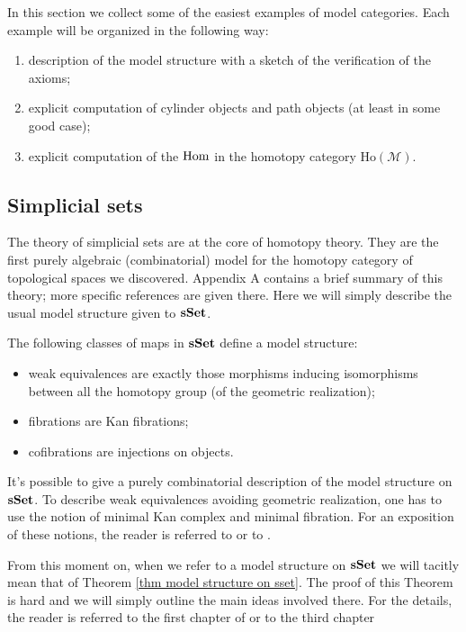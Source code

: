 \begin{refsection}
In this section we collect some of the easiest examples of model categories. Each example will be organized in the following way:

\begin{enumerate}
\item description of the model structure with a sketch of the verification of the axioms;
\item explicit computation of cylinder objects and path objects (at least in some good case);
\item explicit computation of the $\mathrm{Hom}$ in the homotopy category $\mathrm{Ho}(\mathcal M)$.
\end{enumerate}

\subsection{Simplicial sets}

The theory of simplicial sets are at the core of homotopy theory. They are the first purely algebraic (combinatorial) model for the homotopy category of topological spaces we discovered. Appendix A contains a brief summary of this theory; more specific references are given there. Here we will simply describe the usual model structure given to $\mathbf{s\,\!\mathbf{Set}}$.

\begin{thm} \label{thm model structure on sset}
The following classes of maps in $\mathbf{s\,\!\mathbf{Set}}$ define a model structure:
\begin{itemize}
\item weak equivalences are exactly those morphisms inducing isomorphisms between all the homotopy group (of the geometric realization);
\item fibrations are Kan fibrations;
\item cofibrations are injections on objects.
\end{itemize}
\end{thm}

\begin{rmk}
It's possible to give a purely combinatorial description of the model structure on $\mathbf{s\,\!\mathbf{Set}}$. To describe weak equivalences avoiding geometric realization, one has to use the notion of minimal Kan complex and minimal fibration. For an exposition of these notions, the reader is referred to \cite{may} or to \cite[section I.10]{goerss-jardine-simplicial-homotopy-theory}.
\end{rmk}

From this moment on, when we refer to a model structure on $\mathbf{s\,\!\mathbf{Set}}$ we will tacitly mean that of Theorem \ref{thm model structure on sset}. The proof of this Theorem is hard and we will simply outline the main ideas involved there. For the details, the reader is referred to the first chapter of \cite{goerss-jardine-simplicial-homotopy-theory} or to the third chapter 


\end{refsection}
